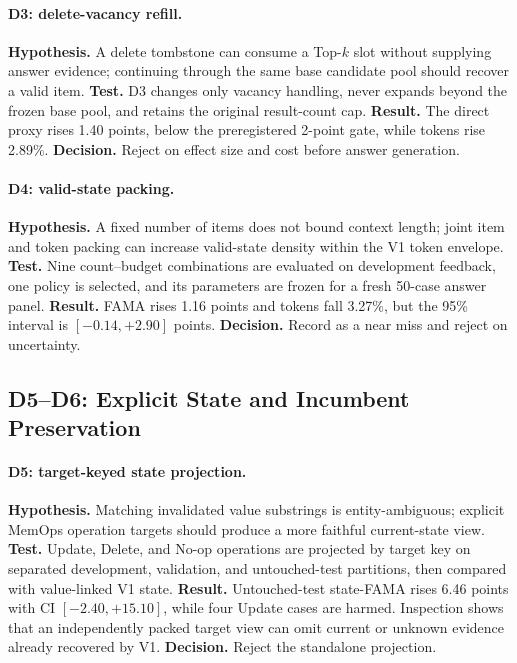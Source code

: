 \documentclass[10pt]{article}
\begin{document}
\paragraph{D3: delete-vacancy refill.}
\textbf{Hypothesis.} A delete tombstone can consume a Top-$k$ slot without supplying answer evidence; continuing through the same base candidate pool should recover a valid item. \textbf{Test.} D3 changes only vacancy handling, never expands beyond the frozen base pool, and retains the original result-count cap. \textbf{Result.} The direct proxy rises 1.40 points, below the preregistered 2-point gate, while tokens rise 2.89\%. \textbf{Decision.} Reject on effect size and cost before answer generation.

\paragraph{D4: valid-state packing.}
\textbf{Hypothesis.} A fixed number of items does not bound context length; joint item and token packing can increase valid-state density within the V1 token envelope. \textbf{Test.} Nine count--budget combinations are evaluated on development feedback, one policy is selected, and its parameters are frozen for a fresh 50-case answer panel. \textbf{Result.} FAMA rises 1.16 points and tokens fall 3.27\%, but the 95\% interval is $[-0.14,+2.90]$ points. \textbf{Decision.} Record as a near miss and reject on uncertainty.

\subsection{D5--D6: Explicit State and Incumbent Preservation}

\paragraph{D5: target-keyed state projection.}
\textbf{Hypothesis.} Matching invalidated value substrings is entity-ambiguous; explicit MemOps operation targets should produce a more faithful current-state view. \textbf{Test.} Update, Delete, and No-op operations are projected by target key on separated development, validation, and untouched-test partitions, then compared with value-linked V1 state. \textbf{Result.} Untouched-test state-FAMA rises 6.46 points with CI $[-2.40,+15.10]$, while four Update cases are harmed. Inspection shows that an independently packed target view can omit current or unknown evidence already recovered by V1. \textbf{Decision.} Reject the standalone projection.
\end{document}
